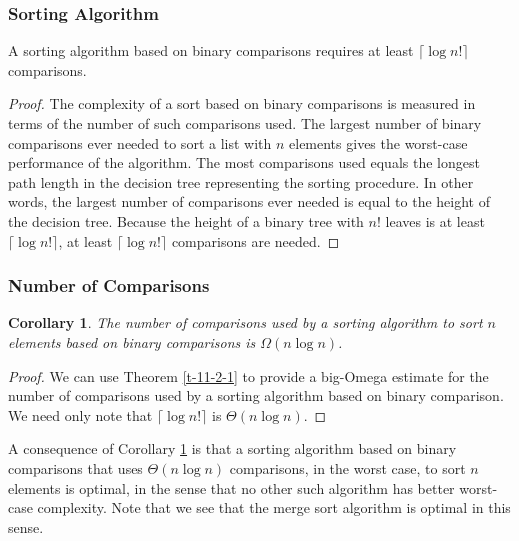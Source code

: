 \documentclass[10pt, compress]{beamer}
\newtheorem{crl}{Corollary}[theorem]
\begin{document}
\begin{frame}
\frametitle{Sorting Algorithm}
\begin{theorem} \label{t-11-2-1}
	A sorting algorithm based on binary comparisons requires at least $\lceil \log n! \rceil$ comparisons.
\end{theorem}
\begin{proof}
	The complexity of a sort based on binary comparisons is measured in terms of the number	of such comparisons used. The largest number of binary comparisons ever needed to sort a list with $n$ elements gives the worst-case performance of the algorithm. The most comparisons used equals the longest path length in the decision tree representing the sorting procedure. In other words, the largest number of comparisons ever needed is equal to the height of the decision
	tree. Because the height of a binary tree with $n!$ leaves is at least $\lceil \log n! \rceil$, at least $\lceil \log n! \rceil$ comparisons are needed.
\end{proof}
\end{frame}

\begin{frame}[fragile]
\frametitle{Number of Comparisons}
\begin{crl}\label{c-11-2-1}
	The number of comparisons used by a sorting algorithm to sort $n$ elements based on binary comparisons is $\Omega(n \log n)$.
\end{crl}
\begin{proof}
	We can use Theorem \ref{t-11-2-1} to provide a big-Omega estimate for the number of comparisons used by a sorting algorithm based on binary comparison. We need only note that $\lceil \log n! \rceil$ is $\Theta(n \log n)$.
\end{proof}

A consequence of Corollary \ref{c-11-2-1} is that a sorting algorithm based on binary comparisons that
uses $\Theta(n \log n)$ comparisons, in the worst case, to sort $n$ elements is optimal, in the sense that no other such algorithm has better worst-case complexity. Note that we see that the merge sort algorithm is optimal in this sense.

\end{frame}
\end{document}
